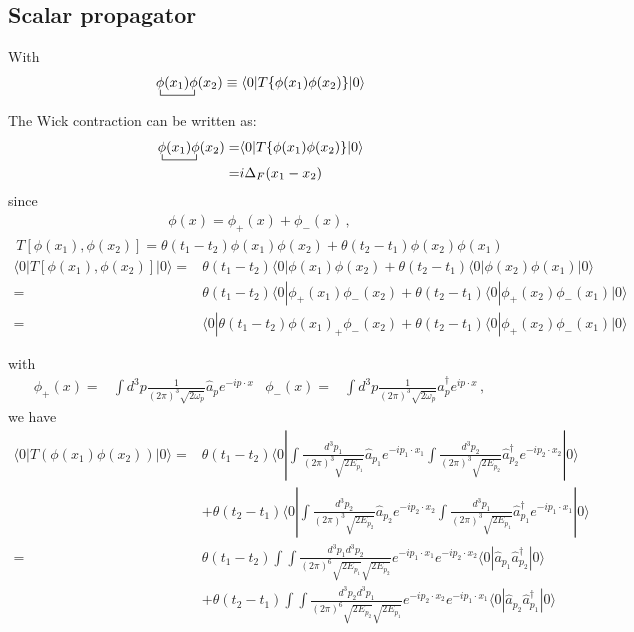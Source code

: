 \subsection{Scalar propagator}

With
\begin{align}
  \bcontraction{\,}{\phi}{(x_1)}{\phi}
\,\phi(x_1)\phi(x_2)\equiv \left\langle 0 |   T\{\phi(x_1)\phi(x_2)\} | 0 \right\rangle
\end{align}




The Wick contraction can be written as:
\begin{align}
\label{eq:77f}
  \bcontraction{\,}{\phi}{(x_1)}{\phi}
\,\phi(x_1)\phi(x_2)=&\langle0|T\{\phi(x_1)\phi(x_2)\}|0\rangle\nonumber\\
=&i\Delta_F(x_1-x_2)
\end{align}
since
\begin{align}
  \phi(x)=\phi_+(x)+\phi_-(x)\,,
\end{align}
\begin{align}
T\left[\phi(x_1),\phi(x_2)\right]=\theta(t_1-t_2)\phi(x_1)\phi(x_2)+\theta(t_2-t_1)\phi(x_2)\phi(x_1)
\end{align}
\begin{align}
    \langle0|T\left[\phi(x_1),\phi(x_2)\right]|0\rangle=&\theta(t_1-t_2)\langle0|\phi(x_1)\phi(x_2)+\theta(t_2-t_1)\langle0|\phi(x_2)\phi(x_1)|0\rangle\nonumber\\
   =&\theta(t_1-t_2)\langle0|\phi_+(x_1)\phi_-(x_2)+\theta(t_2-t_1)\langle0|\phi_+(x_2)\phi_-(x_1)|0\rangle\nonumber\\
     =&\langle0|\theta(t_1-t_2)\phi(x_1)_+\phi_-(x_2)+\theta(t_2-t_1)\langle0|\phi_+(x_2)\phi_-(x_1)|0\rangle
\end{align}

with
\begin{align}
    \phi_+(x)=&\int d^3p \frac{1}{(2\pi)^3\sqrt{2\omega_{p} }}
\widehat{a}_{p} e^{-i p\cdot x }&
    \phi_-(x)=&\int d^3p \frac{1}{(2\pi)^3\sqrt{2\omega_{p} }}
\widehat{a}_{p}^\dagger e^{i p\cdot x }\,,
\end{align}
we have
\begin{align}
  \langle0|T(\phi(x_1)\phi(x_2))|0\rangle
=&\theta(t_1-t_2)\langle0|\int\frac{d^3p_1}{(2\pi)^3\sqrt{2E_{p_1}}}\hat{a}_{p_1}e^{-i p_1\cdot x_1}
\int\frac{d^3p_2}{(2\pi)^3\sqrt{2E_{p_2}}}\hat{a}_{p_2}^\dagger e^{-i p_2\cdot x_2}|0\rangle\nonumber\\
&+\theta(t_2-t_1)\langle0|\int\frac{d^3p_2}{(2\pi)^3\sqrt{2E_{p_2}}}\hat{a}_{p_2}e^{-i p_2\cdot x_2}
\int\frac{d^3p_1}{(2\pi)^3\sqrt{2E_{p_1}}}\hat{a}_{p_1}^\dagger e^{-i p_1\cdot x_1}|0\rangle\nonumber\\
=&\theta(t_1-t_2)\int\int\frac{d^3p_1d^3p_2}{(2\pi)^6\sqrt{2E_{p_1}}\sqrt{2E_{p_2}}}e^{-i p_1\cdot x_1}e^{-i p_2\cdot x_2}
\langle0|\hat{a}_{p_1}\hat{a}_{p_2}^\dagger|0\rangle\nonumber\\
&+\theta(t_2-t_1)\int\int\frac{d^3p_2d^3p_1}{(2\pi)^6\sqrt{2E_{p_2}}\sqrt{2E_{p_1}}}e^{-i p_2\cdot x_2}e^{-i p_1\cdot x_1}
\langle0|\hat{a}_{p_2}\hat{a}_{p_1}^\dagger|0\rangle\nonumber\\
\end{align}

